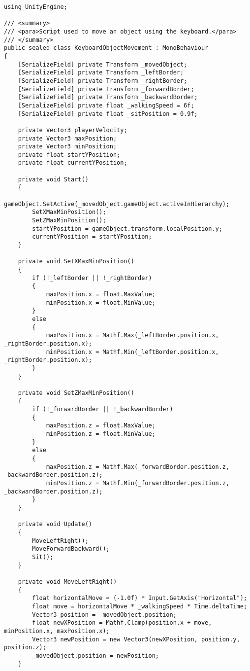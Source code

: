 \begin{verbatim}
using UnityEngine;

/// <summary>
/// <para>Script used to move an object using the keyboard.</para>
/// </summary>
public sealed class KeyboardObjectMovement : MonoBehaviour
{
    [SerializeField] private Transform _movedObject;
    [SerializeField] private Transform _leftBorder;
    [SerializeField] private Transform _rightBorder;
    [SerializeField] private Transform _forwardBorder;
    [SerializeField] private Transform _backwardBorder;
    [SerializeField] private float _walkingSpeed = 6f;
    [SerializeField] private float _sitPosition = 0.9f;

    private Vector3 playerVelocity;
    private Vector3 maxPosition;
    private Vector3 minPosition;
    private float startYPosition;
    private float currentYPosition;

    private void Start()
    {
        gameObject.SetActive(_movedObject.gameObject.activeInHierarchy);
        SetXMaxMinPosition();
        SetZMaxMinPosition();
        startYPosition = gameObject.transform.localPosition.y;
        currentYPosition = startYPosition;
    }

    private void SetXMaxMinPosition()
    {
        if (!_leftBorder || !_rightBorder)
        {
            maxPosition.x = float.MaxValue;
            minPosition.x = float.MinValue;
        }
        else
        {
            maxPosition.x = Mathf.Max(_leftBorder.position.x, _rightBorder.position.x);
            minPosition.x = Mathf.Min(_leftBorder.position.x, _rightBorder.position.x);
        }
    }

    private void SetZMaxMinPosition()
    {
        if (!_forwardBorder || !_backwardBorder)
        {
            maxPosition.z = float.MaxValue;
            minPosition.z = float.MinValue;
        }
        else
        {
            maxPosition.z = Mathf.Max(_forwardBorder.position.z, _backwardBorder.position.z);
            minPosition.z = Mathf.Min(_forwardBorder.position.z, _backwardBorder.position.z);
        }
    }

    private void Update()
    {
        MoveLeftRight();
        MoveForwardBackward();
        Sit();
    }

    private void MoveLeftRight()
    {
        float horizontalMove = (-1.0f) * Input.GetAxis("Horizontal");
        float move = horizontalMove * _walkingSpeed * Time.deltaTime;
        Vector3 position = _movedObject.position;
        float newXPosition = Mathf.Clamp(position.x + move, minPosition.x, maxPosition.x);
        Vector3 newPosition = new Vector3(newXPosition, position.y, position.z);
        _movedObject.position = newPosition;
    }


\end{verbatim}
